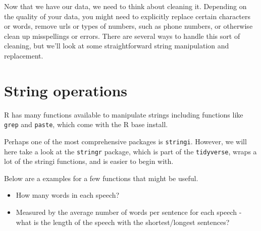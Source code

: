 \documentclass[]{book}
\newenvironment{Shaded}{\begin{snugshade}}{\end{snugshade}}
\newcommand{\KeywordTok}[1]{\textcolor[rgb]{0.13,0.29,0.53}{\textbf{#1}}}
\newcommand{\NormalTok}[1]{#1}
\newcommand{\OperatorTok}[1]{\textcolor[rgb]{0.81,0.36,0.00}{\textbf{#1}}}
\newcommand{\StringTok}[1]{\textcolor[rgb]{0.31,0.60,0.02}{#1}}
\providecommand{\tightlist}{%
  \setlength{\itemsep}{0pt}\setlength{\parskip}{0pt}}
\begin{document}
Now that we have our data, we need to think about cleaning it. Depending on the quality of your data, you might need to explicitly replace certain characters or words, remove urls or types of numbers, such as phone numbers, or otherwise clean up misspellings or errors. There are several ways to handle this sort of cleaning, but we'll look at some straightforward string manipulation and replacement.

\hypertarget{string-operations}{%
\section{String operations}\label{string-operations}}

R has many functions available to manipulate strings including functions like \texttt{grep} and \texttt{paste}, which come with the R base install.

Perhaps one of the most comprehensive packages is \texttt{stringi}. However, we will here take a look at the \texttt{stringr} package, which is part of the \texttt{tidyverse}, wraps a lot of the stringi functions, and is easier to begin with.

Below are a examples for a few functions that might be useful.

\begin{itemize}
\tightlist
\item
  How many words in each speech?
\end{itemize}

\begin{Shaded}
\end{Shaded}

\begin{itemize}
\tightlist
\item
  Measured by the average number of words per sentence for each speech - what is the length of the speech with the shortest/longest sentences?
\end{itemize}

\begin{Shaded}
\end{Shaded}
\end{document}
